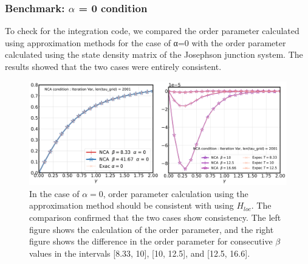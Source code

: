 \documentclass{article}[12pt]
\begin{document}
\begin{spacing}{1.5}
\subsubsection*{Benchmark: $\alpha$ = 0 condition}
To check for the integration code, we compared the order parameter calculated using approximation methods for the case of α=0 
with the order parameter calculated using the state density matrix of the Josephson junction system. 
The results showed that the two cases were entirely consistent.
\begin{figure}[H]
  \centerline{\includegraphics[width=15cm]{TexFigure/4/4_1_03_zero.png}}
  \caption{In the case of $\alpha = 0$, order parameter calculation using the approximation method should be consistent with using $H_{loc}$.
  The comparison confirmed that the two cases show consistency. The left figure shows the calculation of the order parameter, 
  and the right figure shows the difference in the order parameter for consecutive $\beta$ values
  in the intervals [8.33, 10], [10, 12.5], and [12.5, 16.6].}
 \end{figure}
\pagebreak

\end{spacing}
\end{document}
